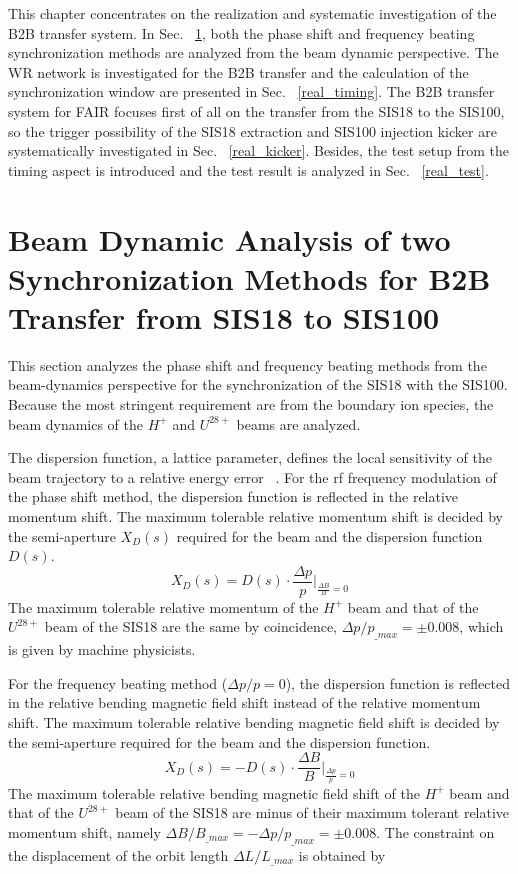 

This chapter concentrates on the realization and systematic investigation of the \gls{B2B} transfer system. In Sec. ~\ref{real_dyn}, both the phase shift and frequency beating synchronization methods are analyzed from the beam dynamic perspective. The WR network is investigated for the B2B transfer and the calculation of the synchronization window are presented in Sec. ~\ref{real_timing}. The B2B transfer system for FAIR focuses first of all on the transfer from the SIS18 to the SIS100, so the trigger possibility of the SIS18 extraction and SIS100 injection kicker are systematically investigated in Sec. ~\ref{real_kicker}. Besides, the test setup from the timing aspect is introduced and the test result is analyzed in Sec. ~\ref{real_test}. 

\section{Beam Dynamic Analysis of two Synchronization Methods for B2B Transfer from SIS18 to SIS100}
\label{real_dyn}
This section analyzes the phase shift and frequency beating methods from the beam-dynamics perspective for the synchronization of the SIS18 with the SIS100. Because the most stringent requirement are from the boundary ion species, the beam dynamics of the $H^+$ and $U^\mathit{28+}$ beams are analyzed.

The dispersion function, a lattice parameter, defines the local sensitivity of the beam trajectory to a relative energy error ~\cite{lee_accelerator_2011}. For the rf frequency modulation of the phase shift method, the dispersion function is reflected in the relative momentum shift. The maximum tolerable relative momentum shift is decided by the semi-aperture $X_D(s)$ required for the beam and the dispersion function $D(s)$.
\begin{equation}
		X_D(s)=D(s)\cdot \frac{\Delta p}{p}|_\mathit{\frac{\Delta B}{B}=0}
\end{equation}
The maximum tolerable relative momentum of the $H^{+}$ beam and that of the $U^\mathit{28+}$ beam of the SIS18 are the same by coincidence, $\Delta p/p_\mathit{\_max}=\pm0.008$, which is given by machine physicists. 

For the frequency beating method ($\Delta p/p=0$), the dispersion function is reflected in the relative bending magnetic field shift instead of the relative momentum shift. The maximum tolerable relative bending magnetic field shift is decided by the semi-aperture required for the beam and the dispersion function. 
\begin{equation}
		X_D(s)=-D(s)\cdot \frac{\Delta B}{B}|_\mathit{\frac{\Delta p}{p}=0}
\end{equation}
The maximum tolerable relative bending magnetic field shift of the $H^{+}$ beam and that of the $U^\mathit{28+}$ beam of the SIS18 are minus of their maximum tolerant relative momentum shift, namely $\Delta B/B_\mathit{\_max}=-\Delta p/p_\mathit{\_max}=\pm0.008$. The constraint on the displacement of the orbit length $\Delta L/L_\mathit{\_max}$ is obtained by 

